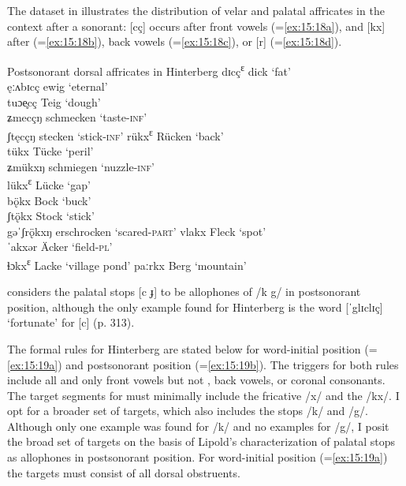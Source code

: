 {The dataset in  illustrates the distribution of velar and palatal affricates in the context after a sonorant: [cç] occurs after front vowels (=\ref{ex:15:18a}), and [kx] after  (=\ref{ex:15:18b}), back vowels (=\ref{ex:15:18c}), or [r] (=\ref{ex:15:18d}).

\ea%
\label{ex:15:18}Postsonorant dorsal affricates in Hinterberg
\ea\label{ex:15:18a} dɪcç\textsuperscript{ɛ} \tab dick \tab ‘fat’ \\
    ęːʌbɪcç \tab ewig \tab ‘eternal’ \\
    tuɔe̥cç \tab Teig \tab ‘dough’ \\
    ʑmecçŋ \tab schmecken \tab ‘taste-\textsc{inf}’ \\
    ʃtęcçŋ \tab stecken \tab ‘stick-\textsc{inf}’ 
\ex\label{ex:15:18b} rükx\textsuperscript{ɛ} \tab Rücken \tab ‘back’ \\
    tükx \tab Tücke \tab ‘peril’ \\
    ʑmükxŋ \tab schmiegen \tab ‘nuzzle-\textsc{inf}’ \\
    lükx\textsuperscript{ɛ} \tab Lücke \tab ‘gap’ \\
    bǫ̈kx \tab Bock \tab ‘buck’ \\
    ʃtǫ̈kx \tab Stock \tab ‘stick’ \\
    gəˈʃrǫ̈kxŋ \tab erschrocken \tab ‘scared-\textsc{part}’ 
\ex\label{ex:15:18c} vlakx \tab Fleck \tab ‘spot’ \\
    ˈakxər \tab Äcker \tab ‘field-\textsc{pl}’ \\
    ɬɔkx\textsuperscript{ɛ} \tab Lacke \tab ‘village pond’ 
\ex\label{ex:15:18d}  paːrkx \tab Berg \tab ‘mountain’ 
    \z
\z 

\citet[370]{Lipold1984} considers the palatal stops [c ɟ] to be allophones of /k g/ in postsonorant position, although the only example found for Hinterberg is the word [ˈglɪclɪç] ‘fortunate’ for [c] (p. 313).

The formal rules for Hinterberg are stated below for word-initial position (=\ref{ex:15:19a}) and postsonorant position (=\ref{ex:15:19b}). The triggers for both rules include all and only front vowels but not , back vowels, or coronal consonants. The target segments for  must minimally include the fricative /x/ and the  /kx/. I opt for a broader set of targets, which also includes the stops /k/ and /g/. Although only one example was found for /k/ and no examples for /g/, I posit the broad set of targets on the basis of Lipold’s characterization of palatal stops as allophones in postsonorant position. For word-initial position (=\ref{ex:15:19a}) the targets must consist of all dorsal obstruents.

}
